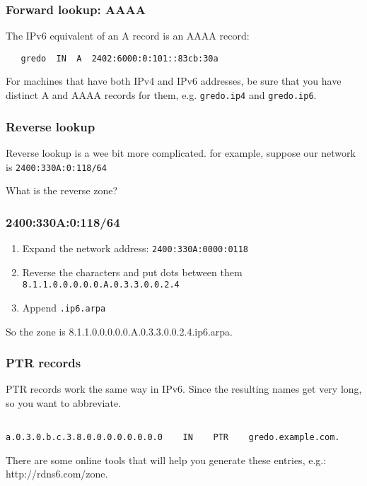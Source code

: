 \documentclass[10pt]{beamer}
\begin{document}
\begin{frame}[fragile]
  \frametitle{Forward lookup: AAAA}
  The IPv6 equivalent of an A record is an AAAA record:

  \begin{verbatim}
   gredo  IN  A  2402:6000:0:101::83cb:30a
  \end{verbatim}

For machines that have both IPv4 and IPv6 addresses, be sure that you 
have distinct A and AAAA records for them, e.g.  \texttt{gredo.ip4} 
and \texttt{gredo.ip6}.
\end{frame}
\begin{frame}
  \frametitle{Reverse lookup}
  Reverse lookup is a wee bit more complicated.  for example, suppose our
  network is \texttt{2400:330A:0:118/64}
  
  What is the reverse zone?

 
\end{frame}
\begin{frame}
  \frametitle{2400:330A:0:118/64}
  \begin{enumerate}
    \item Expand the network address:  \texttt{2400:330A:0000:0118}
    \item Reverse the characters and put dots between them
          \texttt{8.1.1.0.0.0.0.0.A.0.3.3.0.0.2.4}
    \item Append \texttt{.ip6.arpa}
  \end{enumerate}

  So the zone is 8.1.1.0.0.0.0.0.A.0.3.3.0.0.2.4.ip6.arpa.
 
\end{frame}
\begin{frame}[fragile]
  \frametitle{PTR records}
  PTR records work the same way in IPv6. Since the resulting names get
  very long, so you want to abbreviate.
  \begin{verbatim}
   
a.0.3.0.b.c.3.8.0.0.0.0.0.0.0.0    IN    PTR    gredo.example.com.
  \end{verbatim}


There are some online tools that will help you generate these entries, 
e.g.: http://rdns6.com/zone.
\end{frame}
\end{document}
